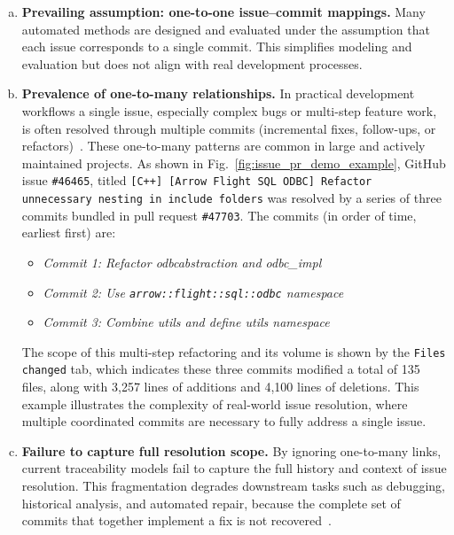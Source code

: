 \begin{enumerate}[a)]
	\item \textbf{Prevailing assumption: one-to-one issue--commit mappings.} Many automated methods are designed and evaluated under the assumption that each issue corresponds to a single commit. This simplifies modeling and evaluation but does not align with real development processes.
	
	\item \textbf{Prevalence of one-to-many relationships.} In practical development workflows a single issue, especially complex bugs or multi-step feature work, is often resolved through multiple commits (incremental fixes, follow-ups, or refactors)~\cite{r7,r17}. These one-to-many patterns are common in large and actively maintained projects. As shown in Fig.~\ref{fig:issue_pr_demo_example}, GitHub issue \texttt{\#46465}, titled \texttt{[C++] [Arrow Flight SQL ODBC] Refactor unnecessary nesting in include folders} was resolved by a series of three commits bundled in pull request \texttt{\#47703}. The commits (in order of time, earliest first) are:
    \begin{itemize}
        \setlength\itemsep{0pt}
        \setlength\parskip{0pt}
        \setlength\topsep{0pt}
        \item \textit{Commit 1: Refactor odbcabstraction and odbc\_impl}
        \item \textit{Commit 2: Use \texttt{arrow::flight::sql::odbc} namespace}
        \item \textit{Commit 3: Combine utils and define utils namespace}
        \end{itemize}

    The scope of this multi-step refactoring and its volume is shown by the \texttt{Files changed} tab, which indicates these three commits modified a total of 135 files, along with 3,257 lines of additions and 4,100 lines of deletions. This example illustrates the complexity of real-world issue resolution, where multiple coordinated commits are necessary to fully address a single issue.

	\item \textbf{Failure to capture full resolution scope.} By ignoring one-to-many links, current traceability models fail to capture the full history and context of issue resolution. This fragmentation degrades downstream tasks such as debugging, historical analysis, and automated repair, because the complete set of commits that together implement a fix is not recovered~\cite{r7}.
\end{enumerate}


